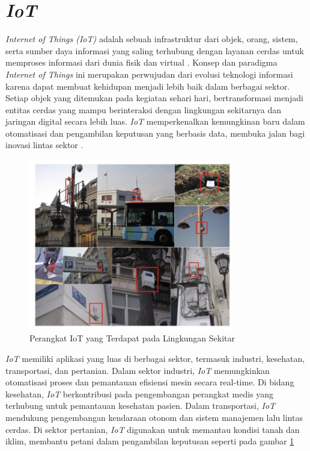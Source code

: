 \section{\textit{IoT}}



\textit{Internet of Things (IoT)} adalah sebuah infrastruktur dari objek, orang, sistem, serta sumber daya informasi yang saling terhubung dengan layanan cerdas untuk memproses informasi dari dunia fisik dan virtual \parencite{Dias2019}. Konsep dan paradigma \textit{Internet of Things} ini merupakan perwujudan dari evolusi teknologi informasi karena dapat membuat kehidupan menjadi lebih baik dalam berbagai sektor. Setiap objek yang ditemukan pada kegiatan sehari hari, bertransformasi menjadi entitas cerdas yang mampu berinteraksi dengan lingkungan sekitarnya dan jaringan digital secara lebih luas. \textit{IoT} memperkenalkan kemungkinan baru dalam otomatisasi dan pengambilan keputusan yang berbasis data, membuka jalan bagi inovasi lintas sektor \parencite{madakam2015internet}.

\begin{figure}[ht]
  \centering
  \includegraphics[width=0.8\textwidth]{resources/chapter-2/gambar-iot.jpg}
  \caption{Perangkat IoT yang Terdapat pada Lingkungan Sekitar \parencite{sotres2017practical}}
  \label{fig:iot-kehidupan-sehari-hari}
\end{figure}

\textit{IoT} memiliki aplikasi yang luas di berbagai sektor, termasuk industri, kesehatan, transportasi, dan pertanian. Dalam sektor industri, \textit{IoT} memungkinkan otomatisasi proses dan pemantauan efisiensi mesin secara real-time. Di bidang kesehatan, \textit{IoT} berkontribusi pada pengembangan perangkat medis yang terhubung untuk pemantauan kesehatan pasien. Dalam transportasi, \textit{IoT} mendukung pengembangan kendaraan otonom dan sistem manajemen lalu lintas cerdas. Di sektor pertanian, \textit{IoT} digunakan untuk memantau kondisi tanah dan iklim, membantu petani dalam pengambilan keputusan seperti pada gambar \ref{fig:iot-kehidupan-sehari-hari}

